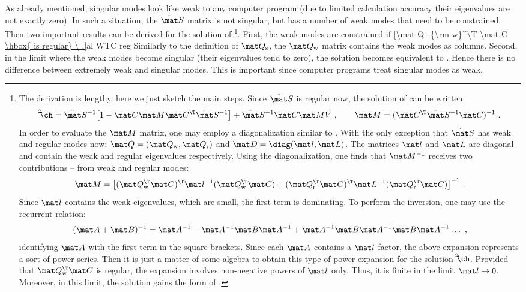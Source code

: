 As already mentioned, singular modes look like weak to any computer program (due to limited calculation accuracy their eigenvalues are not exactly zero). In such a situation, the $\tilde\mat S$ matrix is not singular, but has a number of weak modes that need to be constrained. Then two important results can be derived for the solution of  \footnote{%
The derivation is lengthy, here we just sketch the main steps. Since $\tilde\mat S$ is regular now, the solution of  can be written
$$
	\hat\vec\ch = \tilde\mat S^{-1} \big[ 1 - \mat C \mat M \mat C^\T \tilde\mat S^{-1} \big]
		+ \tilde\mat S^{-1} \mat C \mat M \vec V\ ,\qquad
	\mat M = (\mat C^\T \tilde\mat S^{-1} \mat C)^{-1}\ .
$$
In order to evaluate the $\mat M$ matrix, one may employ a diagonalization similar to . With the only exception that $\tilde\mat S$ has weak and regular modes now: $\mat Q = (\mat Q_{\rm w}, \mat Q_{\rm r})$ and $\mat D = \diag(\mat l, \mat L)$. The matrices $\mat l$ and $\mat L$ are diagonal and contain the weak and regular eigenvalues respectively. Using the diagonalization, one finds that $\mat M^{-1}$ receives two contributions -- from weak and regular modes:
$$ \mat M = \big[
	(\mat Q_{\rm w}^\T \mat C)^\T \mat l^{-1} (\mat Q_{\rm w}^\T \mat C)
	+ (\mat Q_{\rm r}^\T \mat C)^\T \mat L^{-1} (\mat Q_{\rm r}^\T \mat C)
\big]^{-1}\ .$$
Since $\mat l$ contains the weak eigenvalues, which are small, the first term is dominating. To perform the inversion, one may use the recurrent relation:
$$(\mat A+\mat B)^{-1} = \mat A^{-1} - \mat A^{-1} \mat B \mat A^{-1} + \mat A^{-1} \mat B \mat A^{-1} \mat B \mat A^{-1} \ldots\ ,$$
identifying $\mat A$ with the first term in the square brackets. Since each $\mat A$ contains a $\mat l$ factor, the above expansion represents a sort of power series. Then it is just a matter of some algebra to obtain this type of power expansion for the solution $\hat\vec\ch$. Provided that $\mat Q_{\rm w}^\T \mat C$ is regular, the expansion involves non-negative powers of $\mat l$ only. Thus, it is finite in the limit $\mat l\to 0$. Moreover, in this limit, the solution gains the form of .
}.
First, the weak modes are constrained if
\eqref{\mat Q_{\rm w}^\T \mat C \hbox{ is regular} \ .}{al WTC reg}
Similarly to the definition of $\mat Q_{\rm s}$, the $\mat Q_{\rm w}$ matrix contains the weak modes as columns.
Second, in the limit where the weak modes become singular (their eigenvalues tend to zero), the solution becomes equivalent to . Hence there is no difference between extremely weak and singular modes. This is important since computer programs treat singular modes as weak.

